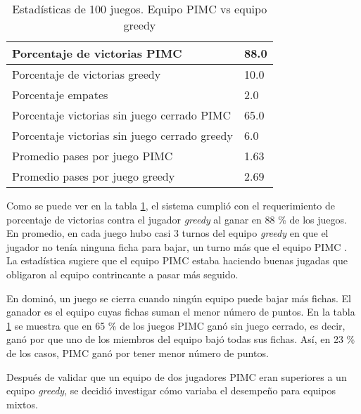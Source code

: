 \begin{table}[!ht]
    \centering
    \caption{Estadísticas de 100 juegos. Equipo PIMC vs equipo greedy}
    \begin{tabular}{|l|l|}
        \hline
        Porcentaje de victorias PIMC                  & 88.0 \\ \hline
        Porcentaje de victorias greedy                & 10.0 \\ \hline
        Porcentaje empates                            & 2.0  \\ \hline
        Porcentaje victorias sin juego cerrado PIMC   & 65.0 \\ \hline
        Porcentaje victorias sin juego cerrado greedy & 6.0  \\ \hline
        Promedio pases por juego PIMC                 & 1.63 \\ \hline
        Promedio pases por juego greedy               & 2.69 \\ \hline
    \end{tabular}
    \label{MINP}
\end{table}

Como se puede ver en la tabla \ref{MINP}, el sistema cumplió con el
requerimiento de porcentaje de victorias contra el jugador \textit{greedy} al
ganar en 88 \% de los juegos. En promedio, en cada juego hubo casi 3 turnos del
equipo \textit{greedy} en que el jugador no tenía ninguna ficha para bajar, un
turno más que el equipo PIMC . La estadística sugiere que el equipo PIMC estaba
haciendo buenas jugadas que obligaron al equipo contrincante a pasar más
seguido.

En dominó, un juego se cierra cuando ningún equipo puede bajar más fichas. El
ganador es el equipo cuyas fichas suman el menor número de puntos. En la tabla
\ref{MINP} se muestra que en 65 \% de los juegos PIMC ganó sin juego cerrado, es
decir, ganó por que uno de los miembros del equipo bajó todas sus fichas. Así,
en 23 \% de los casos, PIMC ganó por tener menor número de puntos.


Después de validar que un equipo de dos jugadores PIMC eran superiores a un
equipo \textit{greedy}, se decidió investigar cómo variaba el desempeño para
equipos mixtos.


